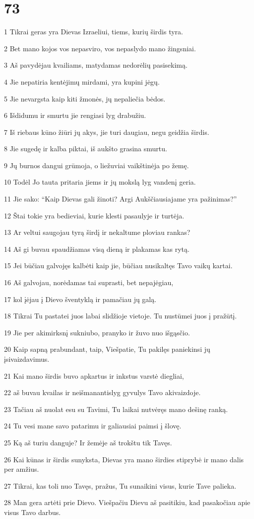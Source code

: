 \chapter{73}


\par 1 Tikrai geras yra Dievas Izraeliui, tiems, kurių širdis tyra. 
\par 2 Bet mano kojos vos nepasviro, vos nepaslydo mano žingsniai. 
\par 3 Aš pavydėjau kvailiams, matydamas nedorėlių pasisekimą. 
\par 4 Jie nepatiria kentėjimų mirdami, yra kupini jėgų. 
\par 5 Jie nevargsta kaip kiti žmonės, jų nepaliečia bėdos. 
\par 6 Išdidumu ir smurtu jie rengiasi lyg drabužiu. 
\par 7 Iš riebaus kūno žiūri jų akys, jie turi daugiau, negu geidžia širdis. 
\par 8 Jie sugedę ir kalba piktai, iš aukšto grasina smurtu. 
\par 9 Jų burnos dangui grūmoja, o liežuviai vaikštinėja po žemę. 
\par 10 Todėl Jo tauta pritaria jiems ir jų mokslą lyg vandenį geria. 
\par 11 Jie sako: “Kaip Dievas gali žinoti? Argi Aukščiausiajame yra pažinimas?” 
\par 12 Štai tokie yra bedieviai, kurie klesti pasaulyje ir turtėja. 
\par 13 Ar veltui saugojau tyrą širdį ir nekaltume ploviau rankas? 
\par 14 Aš gi buvau spaudžiamas visą dieną ir plakamas kas rytą. 
\par 15 Jei būčiau galvojęs kalbėti kaip jie, būčiau nusikaltęs Tavo vaikų kartai. 
\par 16 Aš galvojau, norėdamas tai suprasti, bet nepajėgiau, 
\par 17 kol įėjau į Dievo šventyklą ir pamačiau jų galą. 
\par 18 Tikrai Tu pastatei juos labai slidžioje vietoje. Tu nustūmei juos į pražūtį. 
\par 19 Jie per akimirksnį sukniubo, pranyko ir žuvo nuo išgąsčio. 
\par 20 Kaip sapną prabundant, taip, Viešpatie, Tu pakilęs paniekinsi jų įsivaizdavimus. 
\par 21 Kai mano širdis buvo apkartus ir inkstus varstė diegliai, 
\par 22 aš buvau kvailas ir neišmanantis­lyg gyvulys Tavo akivaizdoje. 
\par 23 Tačiau aš nuolat esu su Tavimi, Tu laikai nutvėręs mano dešinę ranką. 
\par 24 Tu vesi mane savo patarimu ir galiausiai paimsi į šlovę. 
\par 25 Ką aš turiu danguje? Ir žemėje aš trokštu tik Tavęs. 
\par 26 Kai kūnas ir širdis sunyksta, Dievas yra mano širdies stiprybė ir mano dalis per amžius. 
\par 27 Tikrai, kas toli nuo Tavęs, pražus, Tu sunaikini visus, kurie Tave palieka. 
\par 28 Man gera artėti prie Dievo. Viešpačiu Dievu aš pasitikiu, kad pasakočiau apie visus Tavo darbus.


